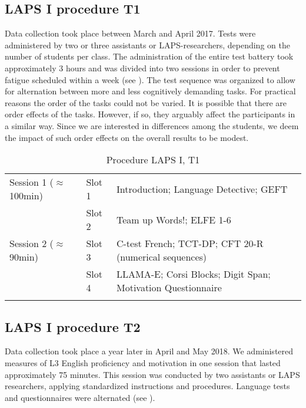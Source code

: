 \documentclass[output=paper]{langsci/langscibook}
\begin{document}
  \subsection{LAPS I procedure T1}


Data collection took place between March and April 2017. Tests were administered by two or three assistants or LAPS-researchers, depending on the number of students per class. The administration of the entire test battery took approximately 3 hours and was divided into two sessions in order to prevent fatigue scheduled within a week (see ). The test sequence was organized to allow for alternation between more and less cognitively demanding tasks. For practical reasons the order of the tasks could not be varied. It is possible that there are order effects of the tasks. However, if so, they arguably affect the participants in a similar way. Since we are interested in differences among the students, we deem the impact of such order effects on the overall results to be modest.


\begin{table}
\begin{tabularx}{\textwidth}{llQ}
\lsptoprule

Session 1 (${\approx}$100min) & Slot 1 & Introduction; Language Detective; GEFT\\
                              & Slot 2 & Team up Words!; ELFE 1-6\\
Session 2 (${\approx}$90min) & Slot 3 & C-test French; TCT-DP; CFT 20-R (numerical sequences)\\
                             & Slot 4 & LLAMA-E; Corsi Blocks; Digit Span; Motivation Questionnaire\\
\lspbottomrule
\end{tabularx}
\caption{Procedure LAPS I, T1\label{tab:02:3}}
\end{table}

\subsection{LAPS I procedure T2}


Data collection took place a year later in April and May 2018. We administered measures of L3 English proficiency and motivation in one session that lasted approximately 75 minutes. This session was conducted by two assistants or LAPS researchers, applying standardized instructions and procedures. Language tests and questionnaires were alternated (see ). 
\end{document}
